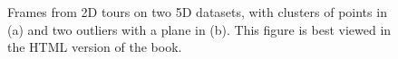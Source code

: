 \documentclass[
  letterpaper,
]{krantz}
\begin{document}
\begin{figure}

\begin{minipage}[t]{0.50\linewidth}

{\centering 


}

\end{minipage}%
%
\begin{minipage}[t]{0.50\linewidth}

{\centering 


}

\end{minipage}%

\caption{\label{fig-tour-intro-pdf}Frames from 2D tours on two 5D
datasets, with clusters of points in (a) and two outliers with a plane
in (b). This figure is best viewed in the HTML version of the book.}

\end{figure}
\end{document}
